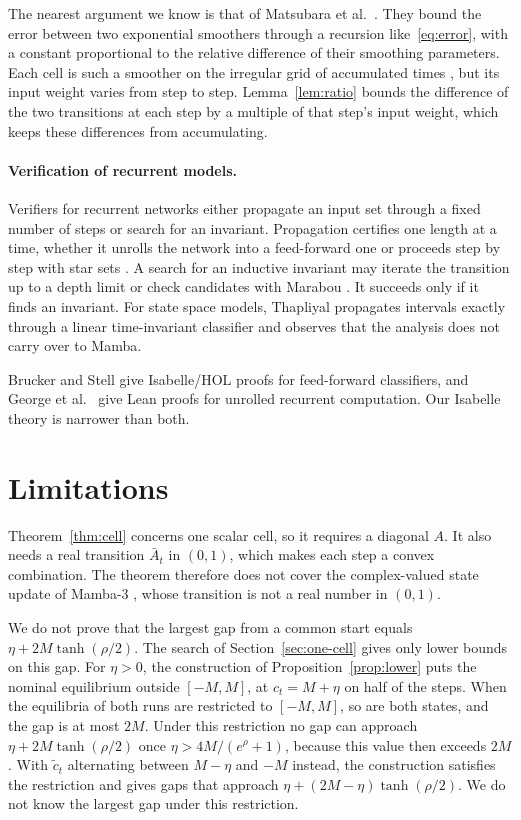 \documentclass[11pt, a4paper]{article}
\theoremstyle{remark}
\theoremstyle{plain}
\newcommand{\Abar}{\bar{A}}
\begin{document}
The nearest argument we know is that of Matsubara
et al.~\citep[Lemma~A.5]{matsubara2026exponential}. They bound the error between two exponential
smoothers through a recursion like~\eqref{eq:error}, with a constant proportional to the relative
difference of their smoothing parameters. Each cell is such a smoother on the irregular grid of
accumulated times \citep[Section~4.1]{eckner2019algorithms}, but its input weight varies from step
to step. Lemma~\ref{lem:ratio} bounds the difference of the
two transitions at each step by a multiple of that step's input weight, which keeps these
differences from accumulating.

\paragraph{Verification of recurrent models.}
Verifiers for recurrent networks either propagate an input set through a fixed number of steps or
search for an invariant. Propagation certifies one length at a time, whether it unrolls the network
into a feed-forward one or proceeds step by step with star sets \citep{tran2023star}. A search for
an inductive invariant may iterate the transition up to a depth limit \citep{hosseini2025ltl} or
check candidates with Marabou \citep{jacoby2020rnn,katz2019marabou}. It succeeds only if it finds
an invariant. For state space models, Thapliyal \citep{thapliyal2026contraction} propagates
intervals exactly through a linear time-invariant classifier and observes that the analysis does
not carry over to Mamba.

Brucker and Stell \citep{brucker2023isabelle} give Isabelle/HOL proofs for feed-forward
classifiers, and George et al.~\citep{george2026torchlean} give Lean proofs for unrolled recurrent
computation. Our Isabelle theory is narrower than both.

\section{Limitations}
\label{sec:limitations}

Theorem~\ref{thm:cell} concerns one scalar cell, so it requires a diagonal $A$. It also needs a
real transition $\Abar_t$ in $(0, 1)$, which makes each step a convex combination. The theorem
therefore does not cover the complex-valued state update of Mamba-3
\citep[Section~3.2]{lahoti2026mamba3}, whose transition is not a real number in $(0, 1)$.

We do not prove that the largest gap from a common start equals $\eta + 2M\tanh(\rho/2)$. The
search of Section~\ref{sec:one-cell} gives only lower bounds on this gap. For $\eta > 0$, the
construction of Proposition~\ref{prop:lower} puts the nominal equilibrium outside $[-M, M]$, at
$c_t = M + \eta$ on half of the steps. When the equilibria of both runs are restricted to
$[-M, M]$, so are both states, and the gap is at most $2M$. Under this restriction no gap can
approach $\eta + 2M\tanh(\rho/2)$ once $\eta > 4M/(e^{\rho} + 1)$, because this value then exceeds
$2M$. With $\tilde c_t$ alternating between $M - \eta$ and $-M$ instead, the construction satisfies
the restriction and gives gaps that approach $\eta + (2M - \eta)\tanh(\rho/2)$. We do not know the
largest gap under this restriction.
\end{document}
